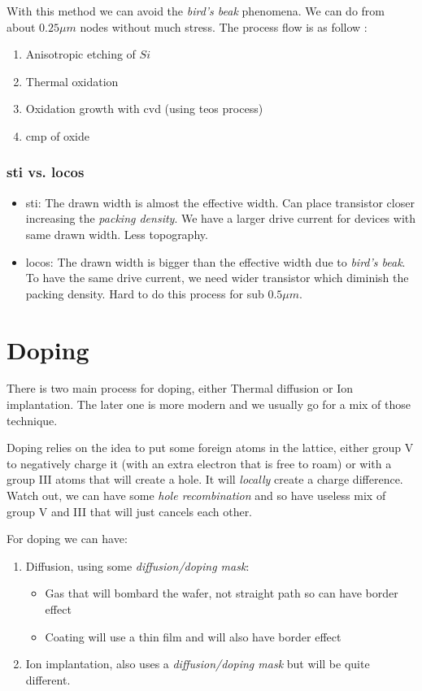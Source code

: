 \documentclass{report}
\begin{document}
With this method we can avoid the \textit{bird's beak} phenomena. We can do from about $0.25 \mu m$ nodes without much stress. The process flow is as follow : 

\begin{enumerate}
    \item Anisotropic etching of $Si$
    \item Thermal oxidation
    \item Oxidation growth with \gls{cvd} (using \gls{teos} process)
    \item \gls{cmp} of oxide
\end{enumerate}

\subsubsection{\gls{sti} vs. \gls{locos}}

\begin{itemize}
    \item \gls{sti}: The drawn width is almost the effective width. Can place transistor closer increasing the \textit{packing density}. We have a larger drive current for devices with same drawn width. Less topography.
    \item \gls{locos}: The drawn width is bigger than the effective width due to \textit{bird's beak}. To have the same drive current, we need wider transistor which diminish the packing density. Hard to do this process for sub $0.5 \mu m$.
\end{itemize}

\section{Doping}

There is two main process for doping, either Thermal diffusion or Ion implantation. The later one is more modern and we usually go for a mix of those technique.

Doping relies on the idea to put some foreign atoms in the lattice, either group V to negatively charge it (with an extra electron that is free to roam) or with a group III atoms that will create a hole. It will \textit{locally} create a charge difference. Watch out, we can have some \textit{hole recombination} and so have useless mix of group V and III that will just cancels each other.

For doping we can have: 

\begin{enumerate}
    \item Diffusion, using some \textit{diffusion/doping mask}:
    \begin{itemize}
        \item Gas that will bombard the wafer, not straight path so can have border effect
        \item Coating will use a thin film and will also have border effect
    \end{itemize}
    \item Ion implantation, also uses a \textit{diffusion/doping mask} but will be quite different.
\end{enumerate}
\end{document}
